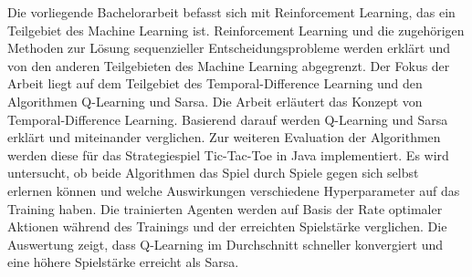 Die vorliegende Bachelorarbeit befasst sich mit Reinforcement Learning, das ein Teilgebiet des Machine Learning ist. 
Reinforcement Learning und die zugehörigen Methoden zur Lösung sequenzieller Entscheidungsprobleme werden erklärt und von den anderen Teilgebieten des Machine Learning abgegrenzt.
Der Fokus der Arbeit liegt auf dem Teilgebiet des Temporal-Difference Learning und den Algorithmen Q-Learning und Sarsa.
Die Arbeit erläutert das Konzept von Temporal-Difference Learning. Basierend darauf werden Q-Learning und Sarsa erklärt und miteinander verglichen.
Zur weiteren Evaluation der Algorithmen werden diese für das Strategiespiel Tic-Tac-Toe in Java implementiert.
Es wird untersucht, ob beide Algorithmen das Spiel durch Spiele gegen sich selbst erlernen können und welche Auswirkungen verschiedene Hyperparameter auf das Training haben.
Die trainierten Agenten werden auf Basis der Rate optimaler Aktionen während des Trainings und der erreichten Spielstärke verglichen.
Die Auswertung zeigt, dass Q-Learning im Durchschnitt schneller konvergiert und eine höhere Spielstärke erreicht als Sarsa.
